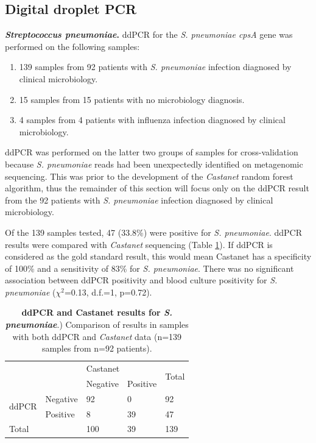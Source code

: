 \subsection{Digital droplet PCR}
\textbf{\textit{Streptococcus pneumoniae}.} ddPCR for the \textit{S. pneumoniae cpsA} gene was performed on the following samples:
\begin{enumerate}
	\item 139 samples from 92 patients with \textit{S. pneumoniae} infection diagnosed by clinical microbiology.
	\item 15 samples from 15 patients with no microbiology diagnosis.
	\item 4 samples from 4 patients with influenza infection diagnosed by clinical microbiology.
\end{enumerate}

ddPCR was performed on the latter two groups of samples for cross-validation because \textit{S. pneumoniae} reads had been unexpectedly identified on metagenomic sequencing. This was prior to the development of the \textit{Castanet} random forest algorithm, thus the remainder of this section will focus only on the ddPCR result from the 92 patients with \textit{S. pneumoniae} infection diagnosed by clinical microbiology.

Of the 139 samples tested, 47 (33.8\%) were positive for \textit{S. pneumoniae}. ddPCR results were compared with \textit{Castanet} sequencing (Table \ref{tab:ddpcr-castanet}). If ddPCR is considered as the gold standard result, this would mean Castanet has a specificity of 100\% and a sensitivity of 83\% for \textit{S. pneumoniae}. There was no significant association between ddPCR positivity and blood culture positivity for \textit{S. pneumoniae} ($\chi^2$=0.13, d.f.=1, p=0.72).

\begin{table}[]
\begin{center}
\begin{tabular}{|l|l|l|l|l|}
\hline
\multicolumn{2}{|l|}{\multirow{2}{*}{}} & \multicolumn{2}{l|}{Castanet} & \multirow{2}{*}{Total} \\ \cline{3-4}
\multicolumn{2}{|l|}{}                  & Negative      & Positive      &                        \\ \hline
\multirow{2}{*}{ddPCR}    & Negative    & 92            & 0             & 92                     \\ \cline{2-5} 
                          & Positive    & 8             & 39            & 47                     \\ \hline
\multicolumn{2}{|l|}{Total}             & 100           & 39            & 139                    \\ \hline
\end{tabular}
\end{center}
\smallskip
\caption[ddPCR and Castanet results for \textit{S. pneumoniae}] {\textbf{ddPCR and Castanet results for \textit{S. pneumoniae}}.) Comparison of results in samples with both ddPCR and \textit{Castanet} data (n=139 samples from n=92 patients).} 
\label{tab:ddpcr-castanet}
\end{table}

